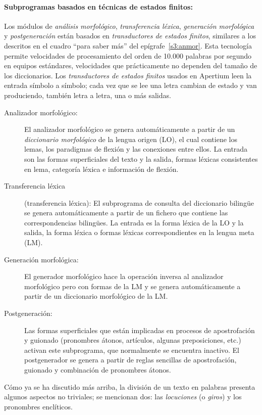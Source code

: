 \paragraph{Subprogramas basados en técnicas de estados finitos:} Los módulos de \emph{análisis morfológico}, \emph{transferencia léxica}, \emph{generación morfológica} y {\em postgeneración} están basados en \emph{transductores de estados finitos}, similares a los descritos en el cuadro ``para saber más'' del epígrafe~\ref{s3:anmor}. Esta tecnología permite velocidades de procesamiento del orden de 10.000 palabras por segundo en equipos estándares, velocidades que prácticamente no dependen del tamaño de los diccionarios. Los \emph{transductores de estados finitos} usados en Apertium leen la entrada símbolo a símbolo; cada vez que se lee una letra cambian de estado y van produciendo, también letra a letra, una o más salidas. \begin{description} \item[Analizador morfológico:] El analizador morfológico se genera automáticamente a partir de un \emph{diccionario morfológico} de la lengua origen (LO), el cual contiene los lemas, los paradigmas de flexión y las conexiones entre ellos. La entrada son las formas superficiales del texto y la salida, formas léxicas consistentes en lema, categoría léxica e información de flexión. \item[Transferencia léxica] (transferencia léxica): El subprograma de consulta del diccionario bilingüe se genera automáticamente a partir de un fichero que contiene las correspondencias bilingües. La entrada es la forma léxica de la LO y la salida, la forma léxica o formas léxicas correspondientes en la lengua meta (LM). \item[Generación morfológica:] El generador morfológico hace la operación inversa al analizador morfológico pero con formas de la LM y se genera automáticamente a partir de un diccionario morfológico de la LM. \item[Postgeneración:] Las formas superficiales que están implicadas en procesos de apostrofación y guionado (pronombres átonos, artículos, algunas preposiciones, etc.) activan este subprograma, que normalmente se encuentra inactivo. El postgenerador se genera a partir de reglas sencillas de apostrofación, guionado y combinación de pronombres átonos. \end{description} Cómo ya se ha discutido más arriba, la división de un texto en palabras presenta algunos aspectos no triviales; se mencionan dos: las \emph{locuciones} (o \emph{giros}) y los pronombres enclíticos. 

